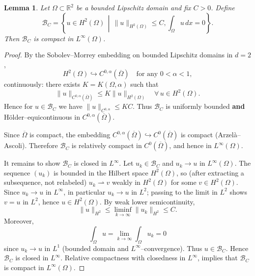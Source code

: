 \documentclass[11pt]{article}
\newtheorem{lemma}{Lemma}
\begin{document}
	
	
	
	\begin{lemma}\label{lemma:compactness}
		Let $\Omega\subset\mathbb{R}^{2}$ be a bounded Lipschitz domain and fix $C>0$.
		Define
		\[
		\mathcal{B}_{C}
		=\left\{
		u\in H^{2}(\Omega)\,\middle|\,
		\|u\|_{H^{2}(\Omega)}\le C,
		\int_{\Omega}u\,dx=0
		\right\}.
		\]
		Then $\mathcal{B}_{C}$ is compact in $L^{\infty}(\Omega)$.
	\end{lemma}
	\begin{proof}
	By the Sobolev–Morrey embedding on bounded Lipschitz domains in $d=2$,
\[
H^2(\Omega) \hookrightarrow C^{0,\alpha}(\overline{\Omega}) \quad \text{for any } 0 < \alpha < 1,
\]
continuously: there exists $K = K(\Omega, \alpha)$ such that
\[
\|u\|_{C^{0,\alpha}(\overline{\Omega})} \le K \|u\|_{H^2(\Omega)} \quad \forall\, u \in H^2(\Omega).
\]
Hence for $u \in \mathcal{B}_C$ we have $\|u\|_{C^{0,\alpha}} \le KC$. Thus $\mathcal{B}_C$ is uniformly bounded \textbf{and} Hölder–equicontinuous in $C^{0,\alpha}(\overline{\Omega})$.

Since $\overline{\Omega}$ is compact, the embedding $C^{0,\alpha}(\overline{\Omega}) \hookrightarrow C^0(\overline{\Omega})$ is compact (Arzelà–Ascoli). Therefore $\mathcal{B}_C$ is relatively compact in $C^0(\overline{\Omega})$, and hence in $L^\infty(\Omega)$.

It remains to show $\mathcal{B}_C$ is closed in $L^\infty$. Let $u_k \in \mathcal{B}_C$ and $u_k \to u$ in $L^\infty(\Omega)$. The sequence $(u_k)$ is bounded in the Hilbert space $H^2(\Omega)$, so (after extracting a subsequence, not relabeled) $u_k \rightharpoonup v$ weakly in $H^2(\Omega)$ for some $v \in H^2(\Omega)$. Since $u_k \to u$ in $L^\infty$, in particular $u_k \to u$ in $L^2$; passing to the limit in $L^2$ shows $v = u$ in $L^2$, hence $u \in H^2(\Omega)$. By weak lower semicontinuity,
\[
\|u\|_{H^2} \le \liminf_{k \to \infty} \|u_k\|_{H^2} \le C.
\]
Moreover,
\[
\int_\Omega u = \lim_{k \to \infty} \int_\Omega u_k = 0
\]
since $u_k \to u$ in $L^1$ (bounded domain and $L^\infty$–convergence). Thus $u \in \mathcal{B}_C$. Hence $\mathcal{B}_C$ is closed in $L^\infty$. Relative compactness with closedness in $L^\infty$, implies that $\mathcal{B}_C$ is compact in $L^\infty(\Omega)$. 
\end{proof}

	
	
\end{document}
